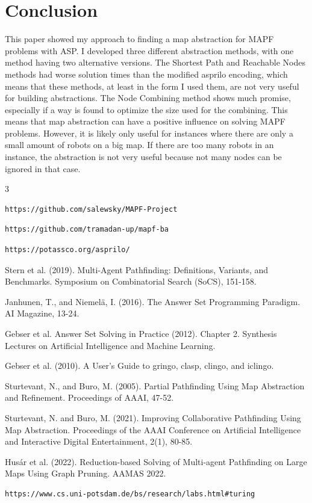 \documentclass[runningheads]{llncs}
\begin{document}
\section{Conclusion}
This paper showed my approach to finding a map abstraction for MAPF problems with ASP. I developed three different abstraction methods, with one method having two alternative versions. The Shortest Path and Reachable Nodes methods had worse solution times than the modified asprilo encoding, which means that these methods, at least in the form I used them, are not very useful for building abstractions. The Node Combining method shows much promise, especially if a way is found to optimize the size used for the combining. This means that map abstraction can have a positive influence on solving MAPF problems. However, it is likely only useful for instances where there are only a small amount of robots on a big map. If there are too many robots in an instance, the abstraction is not very useful because not many nodes can be ignored in that case. 
\newpage

\begin{thebibliography} {3}
\begin{verbatim}
https://github.com/salewsky/MAPF-Project
\end{verbatim}

\begin{verbatim}
https://github.com/tramadan-up/mapf-ba
\end{verbatim}

\begin{verbatim}
https://potassco.org/asprilo/
\end{verbatim}

Stern et al. (2019). Multi-Agent Pathfinding: Definitions, Variants, and Benchmarks. Symposium on Combinatorial Search (SoCS), 151-158.

Janhunen, T., and Niemelä, I. (2016). The Answer Set Programming Paradigm. AI Magazine, 13-24.

Gebser et al. Answer Set Solving in Practice (2012). Chapter 2. Synthesis Lectures on Artificial Intelligence and Machine Learning. 

Gebser et al. (2010). A User's Guide to gringo, clasp, clingo, and iclingo. 

Sturtevant, N., and Buro, M. (2005). Partial Pathfinding Using Map Abstraction and Refinement. Proceedings of AAAI, 47-52.

Sturtevant, N. and Buro, M. (2021). Improving Collaborative Pathfinding Using Map Abstraction. Proceedings of the AAAI Conference on Artificial Intelligence and Interactive Digital Entertainment, 2(1), 80-85.

Husár et al. (2022). Reduction-based Solving of Multi-agent Pathfinding on Large Maps Using Graph Pruning. AAMAS 2022.

\begin{verbatim}
https://www.cs.uni-potsdam.de/bs/research/labs.html#turing
\end{verbatim}

\end{thebibliography}
\end{document}
